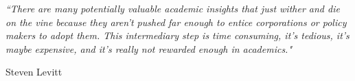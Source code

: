 \documentclass[11pt, a4paper, twoside]{Thesis} %
\begin{document}

\pagestyle{empty} %

\null\vfill %

\textit{``There are many potentially valuable academic insights that just wither and die on the vine because they aren’t pushed far enough to entice corporations or policy makers to adopt them. 
This intermediary step is time consuming, it's tedious, it's maybe expensive, and it's really not rewarded enough in academics."}

\begin{flushright}
Steven Levitt
\end{flushright}

\vfill\vfill\vfill\vfill\vfill\vfill\null %

\clearpage %



\abstract %
\end{document}
